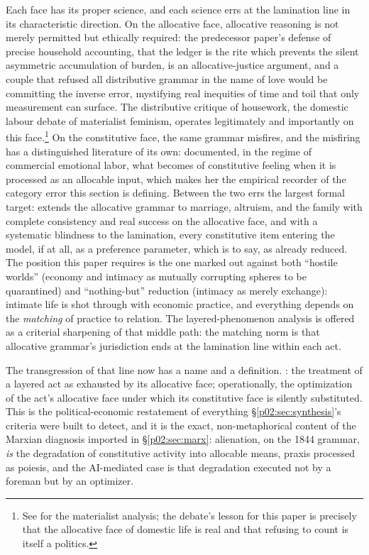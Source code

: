 Each face has its proper science, and each science errs at the lamination line in its characteristic direction. On the allocative face, allocative reasoning is not merely permitted but ethically required: the predecessor paper's defense of precise household accounting, that the ledger is the rite which prevents the silent asymmetric accumulation of burden, is an allocative-justice argument, and a couple that refused all distributive grammar in the name of love would be committing the inverse error, mystifying real inequities of time and toil that only measurement can surface. The distributive critique of housework, the domestic labour debate of materialist feminism, operates legitimately and importantly on this face.\footnote{See \textcite{delphy1984close} for the materialist analysis; the debate's lesson for this paper is precisely that the allocative face of domestic life is real and that refusing to count is itself a politics.} On the constitutive face, the same grammar misfires, and the misfiring has a distinguished literature of its own: \textcite{hochschild1983managed} documented, in the regime of commercial emotional labor, what becomes of constitutive feeling when it is processed as an allocable input, which makes her the empirical recorder of the category error this section is defining. Between the two errs the largest formal target: \textcite{becker1981treatise} extends the allocative grammar to marriage, altruism, and the family with complete consistency and real success on the allocative face, and with a systematic blindness to the lamination, every constitutive item entering the model, if at all, as a preference parameter, which is to say, as already reduced. The position this paper requires is the one \textcite{zelizer2005purchase} marked out against both ``hostile worlds'' (economy and intimacy as mutually corrupting spheres to be quarantined) and ``nothing-but'' reduction (intimacy as merely exchange): intimate life is shot through with economic practice, and everything depends on the \emph{matching} of practice to relation. The layered-phenomenon analysis is offered as a criterial sharpening of that middle path: the matching norm is that allocative grammar's jurisdiction ends at the lamination line within each act.

The transgression of that line now has a name and a definition. : the treatment of a layered act as exhausted by its allocative face; operationally, the optimization of the act's allocative face under which its constitutive face is silently substituted. This is the political-economic restatement of everything \S\ref{p02:sec:synthesis}'s criteria were built to detect, and it is the exact, non-metaphorical content of the Marxian diagnosis imported in \S\ref{p02:sec:marx}: alienation, on the 1844 grammar, \emph{is} the degradation of constitutive activity into allocable means, praxis processed as poiesis, and the AI-mediated case is that degradation executed not by a foreman but by an optimizer.

